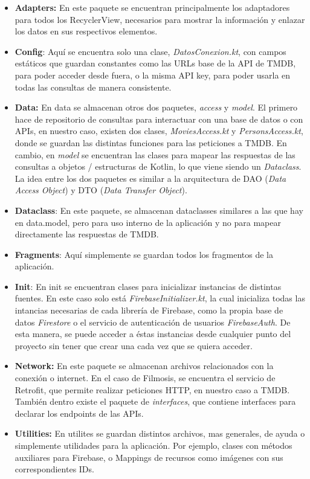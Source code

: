 \documentclass{article}
\begin{document}
    \begin{itemize}
        \item \textbf{Adapters:} En este paquete se encuentran principalmente los adaptadores para todos los RecyclerView, necesarios para mostrar la información y enlazar los datos en sus respectivos elementos.
        \item \textbf{Config}: Aquí se encuentra solo una clase, \textit{DatosConexion.kt}, con campos estáticos que guardan constantes como las URLs base de la API de TMDB, para poder acceder desde fuera, o la misma API key, para poder usarla en todas las consultas de manera consistente.
        \item  \textbf{Data:} En data se almacenan otros dos paquetes, \textit{access} y \textit{model}. El primero hace de repositorio de consultas para interactuar con una base de datos o con APIs, en nuestro caso, existen dos clases, \textit{MoviesAccess.kt} y \textit{PersonsAccess.kt}, donde se guardan las distintas funciones para las peticiones a TMDB. En cambio, en \textit{model} se encuentran las clases para mapear las respuestas de las consultas a objetos / estructuras de Kotlin, lo que viene siendo un \textit{Dataclass}. La idea entre los dos paquetes es similar a la arquitectura de DAO (\textit{Data Access Object}) y DTO (\textit{Data Transfer Object}).
        \item \textbf{Dataclass}: En este paquete, se almacenan dataclasses similares a las que hay en data.model, pero para uso interno de la aplicación y no para mapear directamente las respuestas de TMDB.
        \item \textbf{Fragments}: Aquí simplemente se guardan todos los fragmentos de la aplicación.
        \item \textbf{Init}: En init se encuentran clases para inicializar instancias de distintas fuentes. En este caso solo está \textit{FirebaseInitializer.kt}, la cual inicializa todas las intancias necesarias de cada librería de Firebase, como la propia base de datos \textit{Firestore} o el servicio de autenticación de usuarios \textit{FirebaseAuth}. De esta manera, se puede acceder a éstas instancias desde cualquier punto del proyecto sin tener que crear una cada vez que se quiera acceder.
        \item \textbf{Network:} En este paquete se almacenan archivos relacionados con la conexión o internet. En el caso de Filmosis, se encuentra el servicio de Retrofit, que permite realizar peticiones HTTP, en nuestro caso a TMDB. También dentro existe el paquete de \textit{interfaces}, que contiene interfaces para declarar los endpoints de las APIs.
        \item \textbf{Utilities:} En utilites se guardan distintos archivos, mas generales, de ayuda o simplemente utilidades para la aplicación. Por ejemplo, clases con métodos auxiliares para Firebase, o Mappings de recursos como imágenes con sus correspondientes IDs.
    \end{itemize}
\end{document}

